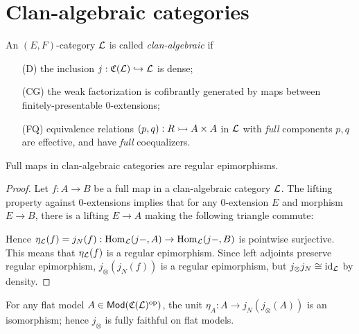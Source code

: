 \documentclass[a4paper]{article}
\begin{document}
\section{Clan-algebraic categories}

\begin{definition}
  An $(E,F)$-category $\mathcal{L}$ is called \emph{clan-algebraic} if
  \begin{enumerate}
  \item[(D)] the inclusion $j : \mathfrak{C}(\mathcal{L}) \hookrightarrow \mathcal{L}$ is dense;
  \item[(CG)] the weak factorization is cofibrantly generated by maps between finitely-presentable $0$-extensions;
  \item[(FQ)] equivalence relations $(p,q) : R \rightarrowtail A \times A$ in $\mathcal{L}$ with \emph{full} components $p, q$ are effective, and have \emph{full} coequalizers.
  \end{enumerate}
\end{definition}

\begin{lemma}
  Full maps in clan-algebraic categories are regular epimorphisms.
\end{lemma}
\begin{proof}
  Let $f : A \to B$ be a full map in a clan-algebraic category $\mathcal{L}$.
  The lifting property against 0-extensions implies that for any $0$-extension $E$ and morphism $E \to B$, there is a lifting $E \to A$ making the following triangle commute:
  \begin{center}
  \end{center}
  Hence $\eta_{\mathcal{L}}(f) = j_{N}(f) : \operatorname{\mathrm{Hom}_{\mathcal{L}}}(j-,A) \to \operatorname{\mathrm{Hom}_{\mathcal{L}}}(j-,B)$ is pointwise surjective.
  This means that $\eta_{\mathcal{L}}(f)$ is a regular epimorphism.
  Since left adjoints preserve regular epimorphism, $j_{\otimes}(j_N(f))$ is a regular epimorphism, but $j_{\otimes}j_N \cong \mathrm{id}_{\mathcal{L}}$ by density.
\end{proof}

\begin{lemma}
  For any flat model $A \in \mathsf{Mod}(\mathfrak{C}(\mathcal{L})^{\mathrm{op}})$, the unit $\eta_A : A \to j_N(j_{\otimes}(A))$ is an isomorphism; hence $j_{\otimes}$ is fully faithful on flat models.
\end{lemma}
\end{document}
